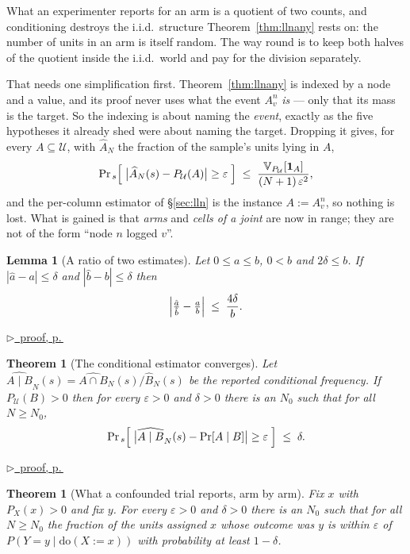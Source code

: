\documentclass[11pt,a4paper]{article}
\theoremstyle{definition}
\theoremstyle{plain}
\newtheorem{theorem}[definition]{Theorem}
\newtheorem{lemma}[definition]{Lemma}
\theoremstyle{remark}
\newcommand{\Ctx}{\mathcal{U}}         %
\newcommand{\emp}[1]{\widehat{#1}}
\newcommand{\Ind}[1]{\mathbf{1}_{#1}}
\newcommand{\Var}{\mathbb{V}}
\renewcommand{\Pr}{\mathrm{Pr}}
\newcommand{\pfref}[1]{%
  \par\smallskip\noindent
  \hyperref[pf:#1]{\small$\triangleright$\ proof, p.\,\pageref{pf:#1}}\par\smallskip}
\begin{document}
What an experimenter reports for an arm is a quotient of two counts, and
conditioning destroys the i.i.d.\ structure Theorem~\ref{thm:llnany} rests
on: the number of units in an arm is itself random. The way round is to
keep both halves of the quotient inside the i.i.d.\ world and pay for the
division separately.

That needs one simplification first. Theorem~\ref{thm:llnany} is indexed by
a node and a value, and its proof never uses what the event $A_v^n$
\emph{is} --- only that its mass is the target. So the indexing is about
naming the \emph{event}, exactly as the five hypotheses it already shed
were about naming the target. Dropping it gives, for every
$A \subseteq \Ctx$, with $\emp{A}_N$ the fraction of the sample's units
lying in $A$,
\[
  \Pr_{\,s}\Bigl[\;\bigl|\emp{A}_N(s) - P_\Ctx(A)\bigr| \ge \varepsilon\;\Bigr]
  \;\le\;
  \frac{\Var_{P_\Ctx}[\Ind{A}]}{(N+1)\,\varepsilon^{2}},
\]
and the per-column estimator of \S\ref{sec:lln} is the instance
$A := A_v^n$, so nothing is lost. What is gained is that \emph{arms} and
\emph{cells of a joint} are now in range; they are not of the form ``node
$n$ logged $v$''.

\begin{lemma}[A ratio of two estimates]
\label{lem:ratio}
Let $0 \le a \le b$, $0 < b$ and $2\delta \le b$. If
$|\hat a - a| \le \delta$ and $|\hat b - b| \le \delta$ then
\[
  \Bigl|\tfrac{\hat a}{\hat b} - \tfrac{a}{b}\Bigr| \;\le\; \frac{4\delta}{b} .
\]
\end{lemma}

\pfref{lem:ratio}

\begin{theorem}[The conditional estimator converges]
\label{thm:empcond}
Let $\emp{A \mid B}_N(s) = \emp{A \cap B}_N(s) / \emp{B}_N(s)$ be the
reported conditional frequency. If $P_\Ctx(B) > 0$ then for every
$\varepsilon > 0$ and $\delta > 0$ there is an $N_0$ such that for all
$N \ge N_0$,
\[
  \Pr_{\,s}\Bigl[\;
    \bigl|\emp{A \mid B}_N(s) - \Pr[A \mid B]\bigr| \ge \varepsilon
  \;\Bigr] \;\le\; \delta .
\]
\end{theorem}

\pfref{thm:empcond}

\begin{theorem}[What a confounded trial reports, arm by arm]
\label{thm:rct3arm}
Fix $x$ with $P_X(x) > 0$ and fix $y$. For every $\varepsilon > 0$ and
$\delta > 0$ there is an $N_0$ such that for all $N \ge N_0$ the fraction
of the units assigned $x$ whose outcome was $y$ is within $\varepsilon$ of
$P(Y = y \mid \mathrm{do}(X := x))$ with probability at least
$1 - \delta$.
\end{theorem}
\end{document}
